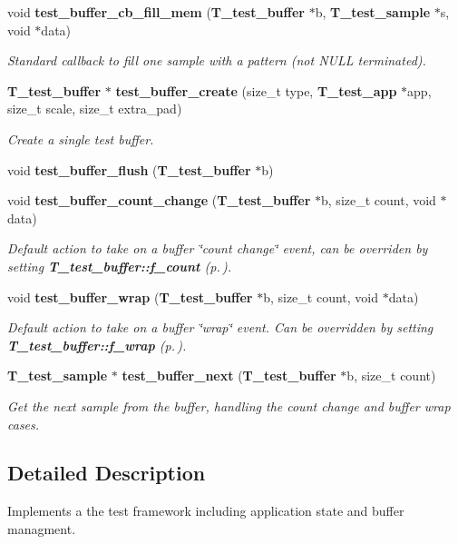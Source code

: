 \begin{CompactItemize}
void {\bf test\_\-buffer\_\-cb\_\-fill\_\-mem} ({\bf T\_\-test\_\-buffer} $\ast$b, {\bf T\_\-test\_\-sample} $\ast$s, void $\ast$data)
\begin{CompactList}\small\item\em Standard callback to fill one sample with a pattern (not NULL terminated).\item\end{CompactList}\item 
{\bf T\_\-test\_\-buffer} $\ast$ {\bf test\_\-buffer\_\-create} (size\_\-t type, {\bf T\_\-test\_\-app} $\ast$app, size\_\-t scale, size\_\-t extra\_\-pad)
\begin{CompactList}\small\item\em Create a single test buffer.\item\end{CompactList}\item 
void {\bf test\_\-buffer\_\-flush} ({\bf T\_\-test\_\-buffer} $\ast$b)
\item 
void {\bf test\_\-buffer\_\-count\_\-change} ({\bf T\_\-test\_\-buffer} $\ast$b, size\_\-t count, void $\ast$data)
\begin{CompactList}\small\item\em Default action to take on a buffer \char`\"{}count change\char`\"{} event, can be overriden by setting {\bf T\_\-test\_\-buffer::f\_\-count} {\rm (p.\,\pageref{structT__test__buffer_m22})}.\item\end{CompactList}\item 
void {\bf test\_\-buffer\_\-wrap} ({\bf T\_\-test\_\-buffer} $\ast$b, size\_\-t count, void $\ast$data)
\begin{CompactList}\small\item\em Default action to take on a buffer \char`\"{}wrap\char`\"{} event. Can be overridden by setting {\bf T\_\-test\_\-buffer::f\_\-wrap} {\rm (p.\,\pageref{structT__test__buffer_m20})}.\item\end{CompactList}\item 
{\bf T\_\-test\_\-sample} $\ast$ {\bf test\_\-buffer\_\-next} ({\bf T\_\-test\_\-buffer} $\ast$b, size\_\-t count)
\begin{CompactList}\small\item\em Get the next sample from the buffer, handling the count change and buffer wrap cases.\item\end{CompactList}\end{CompactItemize}


\subsection{Detailed Description}
Implements a the test framework including application state and buffer managment.




